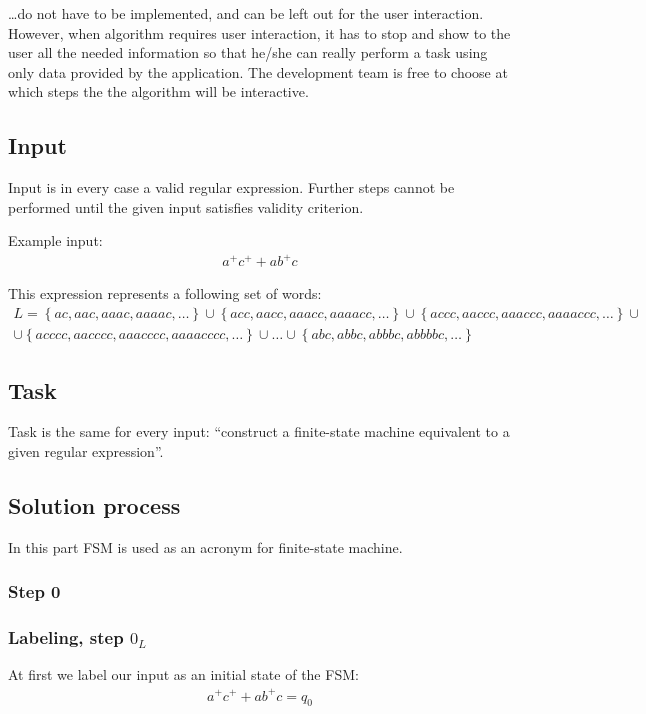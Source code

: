 \documentclass{article}
\begin{document}
\ldots do not have to be implemented, and can be left out for the user interaction. However, when
algorithm requires user interaction, it has to stop and show to the user all the needed information
so that he/she can really perform a task using only data provided by the application. The
development team is free to choose at which steps the the algorithm will be interactive.

\subsection{Input}
Input is in every case a valid regular expression. Further steps cannot be performed until the given
input satisfies validity criterion.

Example input:
\begin{gather*}
a^+c^+ + ab^+c
\end{gather*}

This expression represents a following set of words:
\begin{gather*}
L = \left\{ ac, aac, aaac, aaaac, \ldots \right\} %
\cup \left\{ acc, aacc, aaacc, aaaacc, \ldots \right\} %
\cup \left\{ accc, aaccc, aaaccc, aaaaccc, \ldots \right\} \cup \\
\cup \left\{ acccc, aacccc, aaacccc, aaaacccc, \ldots \right\} %
\cup \ldots %
\cup \left\{ abc, abbc, abbbc, abbbbc, \ldots \right\}
\end{gather*}

\subsection{Task}
Task is the same for every input: ``construct a finite-state machine equivalent to a given regular
expression''.

\subsection{Solution process}
\label{sec:solutionprocess}
In this part FSM is used as an acronym for finite-state machine.

\subsubsection{Step 0}
\label{sec:step0}

\subsubsection*{Labeling, step $0_L$}
At first we label our input as an initial state of the FSM:
\begin{gather*}
a^+c^+ + ab^+c = q_0
\end{gather*}
\end{document}
